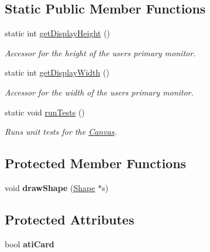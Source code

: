\subsection*{Static Public Member Functions}
\begin{DoxyCompactItemize}
\item 
static int \hyperlink{classtsgl_1_1_canvas_a664b101f972845eaf5fdc4d9e664e623}{get\+Display\+Height} ()
\begin{DoxyCompactList}\small\item\em Accessor for the height of the user\textquotesingle{}s primary monitor. \end{DoxyCompactList}\item 
static int \hyperlink{classtsgl_1_1_canvas_abbe5c392cac2320fecf1f2751afb207c}{get\+Display\+Width} ()
\begin{DoxyCompactList}\small\item\em Accessor for the width of the user\textquotesingle{}s primary monitor. \end{DoxyCompactList}\item 
\hypertarget{classtsgl_1_1_canvas_a3365d92635f650cca2eda69812bef60b}{}static void \hyperlink{classtsgl_1_1_canvas_a3365d92635f650cca2eda69812bef60b}{run\+Tests} ()\label{classtsgl_1_1_canvas_a3365d92635f650cca2eda69812bef60b}

\begin{DoxyCompactList}\small\item\em Runs unit tests for the \hyperlink{classtsgl_1_1_canvas}{Canvas}. \end{DoxyCompactList}\end{DoxyCompactItemize}
\subsection*{Protected Member Functions}
\begin{DoxyCompactItemize}
\item 
\hypertarget{classtsgl_1_1_canvas_a560e3f64f3b2e5a7af8a8d7b92d8e660}{}void {\bfseries draw\+Shape} (\hyperlink{classtsgl_1_1_shape}{Shape} $\ast$s)\label{classtsgl_1_1_canvas_a560e3f64f3b2e5a7af8a8d7b92d8e660}

\end{DoxyCompactItemize}
\subsection*{Protected Attributes}
\begin{DoxyCompactItemize}
\item 
\hypertarget{classtsgl_1_1_canvas_a1558f2f09228ccaf0d46cec233a2dac7}{}bool {\bfseries ati\+Card}\label{classtsgl_1_1_canvas_a1558f2f09228ccaf0d46cec233a2dac7}

\end{DoxyCompactItemize}


